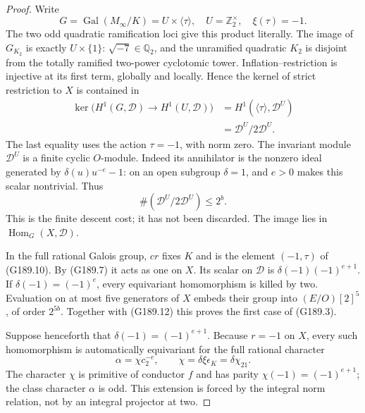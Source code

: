 \begin{proof}
Write
\[
 G=\operatorname{Gal}(M_\infty/K)
       =U\times\langle\tau\rangle,
       \quad U=\mathbb Z_2^\times,\quad \xi(\tau)=-1.
 \tag{G189.10}
\]
The two odd quadratic ramification loci give this product literally.
The image of $G_{K_2}$ is exactly $U\times\{1\}$:
$\sqrt{-7}\in\mathbb Q_2$, and the unramified quadratic $K_2$
is disjoint from the totally ramified two-power cyclotomic tower.
Inflation--restriction is injective at its first term, globally
and locally.  Hence the kernel of strict restriction to $X$
is contained in
\[
 \begin{aligned}
 \ker\bigl(H^1(G,\mathscr D)\to H^1(U,\mathscr D)\bigr)
       &=H^1(\langle\tau\rangle,\mathscr D^U)\\
       &=\mathscr D^U/2\mathscr D^U.
 \end{aligned}
 \tag{G189.11}
\]
The last equality uses the action $\tau=-1$, with norm zero.
The invariant module $\mathscr D^U$ is a finite cyclic
$O$-module.  Indeed its annihilator is the nonzero ideal generated
by $\delta(u)u^{-e}-1$: on an open subgroup $\delta=1$, and
$e>0$ makes this scalar nontrivial.  Thus
\[
              \#(\mathscr D^U/2\mathscr D^U)\leq2^b.
 \tag{G189.12}
\]
This is the finite descent cost; it has not been discarded.
The image lies in $\operatorname{Hom}_G(X,\mathscr D)$.

In the full rational Galois group, $c r$ fixes $K$ and is the
element $(-1,\tau)$ of (G189.10).  By (G189.7) it acts as one
on $X$.  Its scalar on $\mathscr D$ is
$\delta(-1)(-1)^{e+1}$.
If $\delta(-1)=(-1)^e$, every equivariant homomorphism is killed
by two.  Evaluation on at most five generators of $X$ embeds
their group into $(E/O)[2]^5$, of order $2^{5b}$.
Together with (G189.12) this proves the first case of (G189.3).

Suppose henceforth that $\delta(-1)=(-1)^{e+1}$.
Because $r=-1$ on $X$, every such homomorphism is automatically
equivariant for the full rational character
\[
        \alpha=\chi c_2^{-e},\qquad
        \chi=\delta\xi\epsilon_K=\delta\chi_{21}.
 \tag{G189.13}
\]
The character $\chi$ is primitive of conductor $f$ and has parity
$\chi(-1)=(-1)^{e+1}$; the class character $\alpha$ is odd.
This extension is forced by the integral norm relation, not by
an integral projector at two.


\end{proof}
